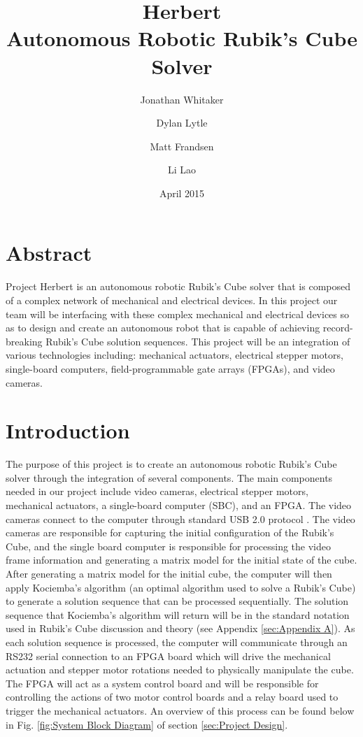 \documentclass[11pt,english]{article}
\title{Herbert\\Autonomous Robotic Rubik's Cube Solver}
\author{
    Jonathan Whitaker\\
    \textt{jon.whitaker@utah.edu}
    \and
    Dylan Lytle\\
    \textt{dylanmlytle@gmail.com}
    \and
    Matt Frandsen\\
    \textt{matt.frandsen@utah.edu}
    \and
    Li Lao\\
    \textt{li.lao@utah.edu}
}
\date{April 2015}
\begin{document}
\maketitle

\tableofcontents

\section{Abstract}
Project Herbert is an autonomous robotic Rubik's Cube solver that is composed of a complex network of mechanical and electrical devices. In this project our team will be interfacing with these complex mechanical and electrical devices so as to design and create an autonomous robot that is capable of achieving record-breaking Rubik's Cube solution sequences.  This project will be an integration of various technologies including: mechanical actuators, electrical stepper motors, single-board computers, field-programmable gate arrays (FPGAs), and video cameras.

\section{Introduction}
The purpose of this project is to create an autonomous robotic Rubik's Cube solver through the integration of several components. The main components needed in our project include video cameras, electrical stepper motors, mechanical actuators, a single-board computer (SBC), and an FPGA. The video cameras connect to the computer through standard USB 2.0 protocol \cite{USB 2.0}. The video cameras are responsible for capturing the initial configuration of the Rubik's Cube, and the single board computer is responsible for processing the video frame information and generating a matrix model for the initial state of the cube. After generating a matrix model for the initial cube, the computer will then apply Kociemba's algorithm \cite{Kociemba} (an optimal algorithm used to solve a Rubik's Cube) to generate a solution sequence that can be processed sequentially. The solution sequence that Kociemba's algorithm will return will be in the standard notation used in Rubik's Cube discussion and theory (see Appendix \ref{sec:Appendix A}). As each solution sequence is processed, the computer will communicate through an RS232 serial connection to an FPGA board which will drive the mechanical actuation and stepper motor rotations needed to physically manipulate the cube. The FPGA will act as a system control board and will be responsible for controlling the actions of two motor control boards and a relay board used to trigger the mechanical actuators. An overview of this process can be found below in Fig. \ref{fig:System Block Diagram} of section \ref{sec:Project Design}.
\end{document}
